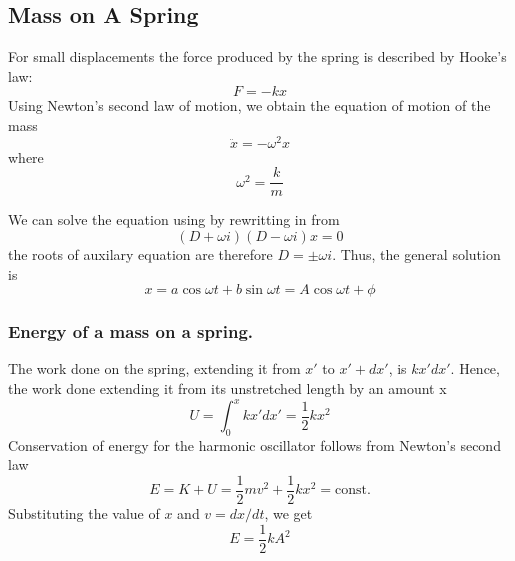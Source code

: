 \documentclass[../../../main.tex]{subfiles}
\begin{document}
\subsection{Mass on A Spring}
For small displacements the force produced by the spring is described by Hooke's law:
\begin{equation*}
    F = -kx 
\end{equation*}
Using Newton's second law of motion, we obtain the equation of motion of the mass
\begin{equation*}
   \ddot{x}=-\omega^2 x
\end{equation*}
where
\begin{equation*}
    \omega^2=\frac{k}{m}
\end{equation*}

We can solve the equation using by rewritting in from
\begin{equation*}
    (D+\omega i)(D-\omega i)x=0
\end{equation*}
the roots of auxilary equation are therefore $D=\pm \omega i$. Thus, the general solution is
\begin{equation*}
    x=a\cos \omega t+ b \sin \omega t= A\cos \omega t +\phi
\end{equation*}

\subsubsection{Energy of a mass on a spring.} The work done on the spring, extending it from $x'$ to $ x' + dx'$, is $kx'dx'$. Hence, the work done extending it from its unstretched length by an amount x
\begin{equation*}
    U=\int_{0}^{x}kx'dx'= \frac{1}{2} kx^2
\end{equation*}
Conservation of energy for the harmonic oscillator follows from Newton's second law
\begin{equation*}
    E=K+U=\frac{1}{2}mv^2+\frac{1}{2}kx^2=\text{const.}
\end{equation*}
Substituting the value of $x$ and $v=dx/dt$, we get
\begin{equation*}
    E=\frac{1}{2}kA^2
\end{equation*}
\end{document}
